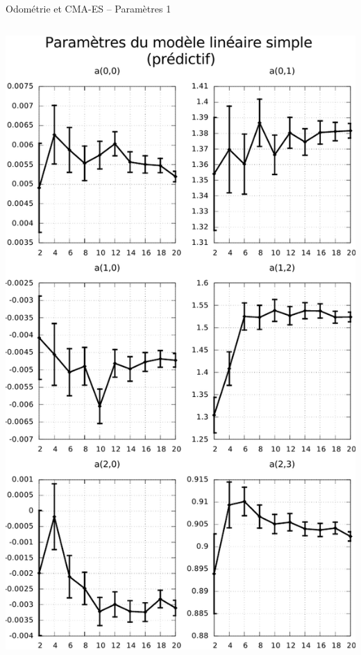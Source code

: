 \begin{frame}[noframenumbering]{Odométrie et CMA-ES -- Paramètres 1}
\begin{columns}
\begin{column}{0.5\linewidth}
            \includegraphics[type=pdf,ext=.pdf,read=.pdf,width=0.75\linewidth]{../plot/OdometryCMAES/parametersSimpleOrders}
        \end{column}
    \end{columns}
    \centering
\end{frame}

